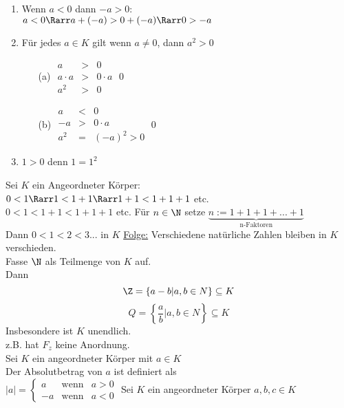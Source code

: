 	\begin{enumerate}
	\item{Wenn $a < 0$ dann $-a > 0$:\\
	$a < 0 \Rarr a + (-a) > 0 + (-a) \Rarr 0 > -a$}
	\item{Für jedes $a \in K $ gilt wenn $a \neq 0$, dann $a^2 > 0$\\
	\begin{itemize}
	\item[(a)]{$\begin{array}{ccc}
	a &>& 0\\
	a · a &>& 0 · a\\
	a^2 &>& 0
	\end{array}$\qed}
	\item[(b)]{$\begin{array}{ccc}
		a &<& 0\\
		-a &>& 0 · a\\
		a^2 &=& (-a)^2 > 0
		\end{array}$\qed}
	\end{itemize}}
	\item{$1 > 0 $ denn $1 = 1^2$}
	\end{enumerate}
	Sei $K$ ein Angeordneter Körper:\\
	$0 < 1 \Rarr 1 < 1 + 1 \Rarr 1 + 1 < 1 + 1 + 1 $ etc.\\
	$0 < 1 < 1 + 1 < 1 + 1 +1 $ etc.
	Für $n \in \N$ setze $\underbrace{n:= 1 + 1 + 1 + ... + 1}_{\text{n-Faktoren}}$\\
	Dann $0 < 1 < 2 < 3 ... $ in $K$
	\ul{Folge:} Verschiedene natürliche Zahlen bleiben in $K$ verschieden.\\
	Fasse $\N$ als Teilmenge von $K$ auf.\\
	Dann 
	$$\Z = \left\lbrace a - b | a, b \in N \right\rbrace \subseteq K$$
$$Q = \left\lbrace \frac{a}{b} | a, b \in N\right\rbrace \subseteq K$$
	Insbesondere ist $K$ unendlich.\\[4pt]
	z.B. hat $F_z$ keine Anordnung.\\[4pt]
\Def
	Sei $K$ ein angeordneter Körper mit $a \in K$\\
	Der Absolutbetrag von $a$ ist definiert als \\
	$|a| = \left\lbrace \begin{array}{lll}
	a & \text{wenn} & a > 0\\
	-a & \text{wenn} & a < 0
	\end{array}\right.$
\Satz
	Sei $K$ ein angeordneter Körper $a, b, c \in K$\\
